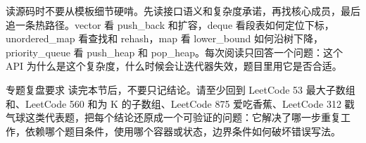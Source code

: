 读源码时不要从模板细节硬啃。先读接口语义和复杂度承诺，再找核心成员，最后追一条热路径。vector 看 push\_back 和扩容，deque 看段表如何定位下标，unordered\_map 看查找和 rehash，map 看 lower\_bound 如何沿树下降，priority\_queue 看 push\_heap 和 pop\_heap。每次阅读只回答一个问题：这个 API 为什么是这个复杂度，什么时候会让迭代器失效，题目里用它是否合适。

\begin{principlebox}{专题复盘要求}
读完本节后，不要只记结论。请至少回到 LeetCode 53 最大子数组和、LeetCode 560 和为 K 的子数组、LeetCode 875 爱吃香蕉、LeetCode 312 戳气球这类代表题，把每个结论还原成一个可验证的问题：它解决了哪一步重复工作，依赖哪个题目条件，使用哪个容器或状态，边界条件如何破坏错误写法。
\end{principlebox}
